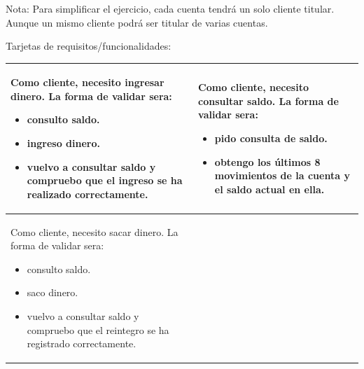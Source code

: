 \documentclass[spanish,12pt,a4paper,final,oneside]{book}
\begin{document}
Nota: Para simplificar el ejercicio, cada cuenta tendrá un solo cliente titular. Aunque un mismo cliente podrá ser titular de varias cuentas.

\vspace{1cm}
Tarjetas de requisitos/funcionalidades:

\def\arraystretch{2}
\begin{longtable}{|p{7cm}|p{7cm}|}

\hline

Como cliente, necesito ingresar dinero.
\newline \newline
La forma de validar sera:
\begin{itemize}
\item consulto saldo.                                
\item ingreso dinero.
\item vuelvo a consultar saldo y compruebo que el ingreso se ha realizado correctamente.
\end{itemize}

&

Como cliente, necesito consultar saldo. 
\newline \newline                     
La forma de validar sera:
\begin{itemize}
\item pido consulta de saldo.
\item obtengo los últimos 8 movimientos de la cuenta y el saldo actual en ella.
\end{itemize}

\\ \hline

Como cliente, necesito sacar dinero. 
\newline \newline
La forma de validar sera:
\begin{itemize}
\item consulto saldo.
\item saco dinero.
\item vuelvo a consultar saldo y compruebo que el reintegro se ha registrado correctamente.
\end{itemize}                        

&                        
                

\end{longtable}
\end{document}

